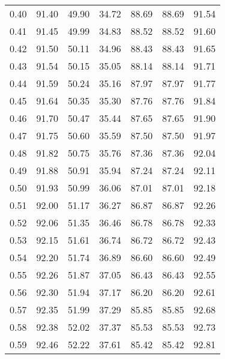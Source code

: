 \begin{tabular}{|c|c|c|c|c|c|c|}
      0.40 &     91.40 &     49.90 &      34.72 &   88.69 &      88.69 &         91.54 \\
      0.41 &     91.45 &     49.99 &      34.83 &   88.52 &      88.52 &         91.60 \\
      0.42 &     91.50 &     50.11 &      34.96 &   88.43 &      88.43 &         91.65 \\
      0.43 &     91.54 &     50.15 &      35.05 &   88.14 &      88.14 &         91.71 \\
      0.44 &     91.59 &     50.24 &      35.16 &   87.97 &      87.97 &         91.77 \\
      0.45 &     91.64 &     50.35 &      35.30 &   87.76 &      87.76 &         91.84 \\
      0.46 &     91.70 &     50.47 &      35.44 &   87.65 &      87.65 &         91.90 \\
      0.47 &     91.75 &     50.60 &      35.59 &   87.50 &      87.50 &         91.97 \\
      0.48 &     91.82 &     50.75 &      35.76 &   87.36 &      87.36 &         92.04 \\
      0.49 &     91.88 &     50.91 &      35.94 &   87.24 &      87.24 &         92.11 \\
      0.50 &     91.93 &     50.99 &      36.06 &   87.01 &      87.01 &         92.18 \\
      0.51 &     92.00 &     51.17 &      36.27 &   86.87 &      86.87 &         92.26 \\
      0.52 &     92.06 &     51.35 &      36.46 &   86.78 &      86.78 &         92.33 \\
      0.53 &     92.15 &     51.61 &      36.74 &   86.72 &      86.72 &         92.43 \\
      0.54 &     92.20 &     51.74 &      36.89 &   86.60 &      86.60 &         92.49 \\
      0.55 &     92.26 &     51.87 &      37.05 &   86.43 &      86.43 &         92.55 \\
      0.56 &     92.30 &     51.94 &      37.17 &   86.20 &      86.20 &         92.61 \\
      0.57 &     92.35 &     51.99 &      37.29 &   85.85 &      85.85 &         92.68 \\
      0.58 &     92.38 &     52.02 &      37.37 &   85.53 &      85.53 &         92.73 \\
      0.59 &     92.46 &     52.22 &      37.61 &   85.42 &      85.42 &         92.81 \\

\end{tabular}
